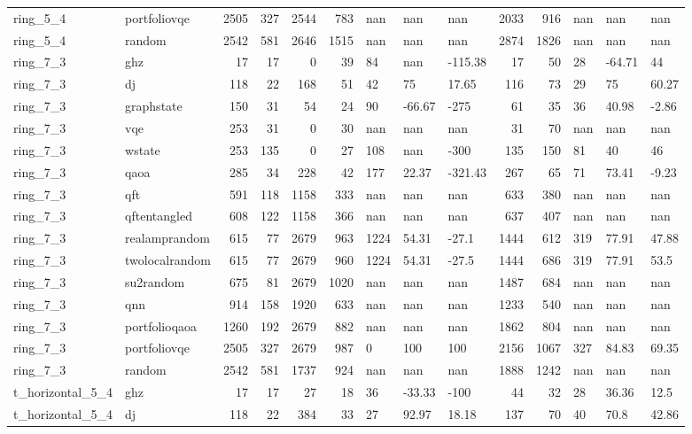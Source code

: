 \begin{longtable}{llrrrrlllrrlll}
ring\_5\_4 & portfoliovqe & 2505 & 327 & 2544 & 783 & nan & nan & nan & 2033 & 916 & nan & nan & nan \\
ring\_5\_4 & random & 2542 & 581 & 2646 & 1515 & nan & nan & nan & 2874 & 1826 & nan & nan & nan \\
ring\_7\_3 & ghz & 17 & 17 & 0 & 39 & 84 & nan & -115.38 & 17 & 50 & 28 & -64.71 & 44 \\
ring\_7\_3 & dj & 118 & 22 & 168 & 51 & 42 & 75 & 17.65 & 116 & 73 & 29 & 75 & 60.27 \\
ring\_7\_3 & graphstate & 150 & 31 & 54 & 24 & 90 & -66.67 & -275 & 61 & 35 & 36 & 40.98 & -2.86 \\
ring\_7\_3 & vqe & 253 & 31 & 0 & 30 & nan & nan & nan & 31 & 70 & nan & nan & nan \\
ring\_7\_3 & wstate & 253 & 135 & 0 & 27 & 108 & nan & -300 & 135 & 150 & 81 & 40 & 46 \\
ring\_7\_3 & qaoa & 285 & 34 & 228 & 42 & 177 & 22.37 & -321.43 & 267 & 65 & 71 & 73.41 & -9.23 \\
ring\_7\_3 & qft & 591 & 118 & 1158 & 333 & nan & nan & nan & 633 & 380 & nan & nan & nan \\
ring\_7\_3 & qftentangled & 608 & 122 & 1158 & 366 & nan & nan & nan & 637 & 407 & nan & nan & nan \\
ring\_7\_3 & realamprandom & 615 & 77 & 2679 & 963 & 1224 & 54.31 & -27.1 & 1444 & 612 & 319 & 77.91 & 47.88 \\
ring\_7\_3 & twolocalrandom & 615 & 77 & 2679 & 960 & 1224 & 54.31 & -27.5 & 1444 & 686 & 319 & 77.91 & 53.5 \\
ring\_7\_3 & su2random & 675 & 81 & 2679 & 1020 & nan & nan & nan & 1487 & 684 & nan & nan & nan \\
ring\_7\_3 & qnn & 914 & 158 & 1920 & 633 & nan & nan & nan & 1233 & 540 & nan & nan & nan \\
ring\_7\_3 & portfolioqaoa & 1260 & 192 & 2679 & 882 & nan & nan & nan & 1862 & 804 & nan & nan & nan \\
ring\_7\_3 & portfoliovqe & 2505 & 327 & 2679 & 987 & 0 & 100 & 100 & 2156 & 1067 & 327 & 84.83 & 69.35 \\
ring\_7\_3 & random & 2542 & 581 & 1737 & 924 & nan & nan & nan & 1888 & 1242 & nan & nan & nan \\
t\_horizontal\_5\_4 & ghz & 17 & 17 & 27 & 18 & 36 & -33.33 & -100 & 44 & 32 & 28 & 36.36 & 12.5 \\
t\_horizontal\_5\_4 & dj & 118 & 22 & 384 & 33 & 27 & 92.97 & 18.18 & 137 & 70 & 40 & 70.8 & 42.86 \\

\end{longtable}
